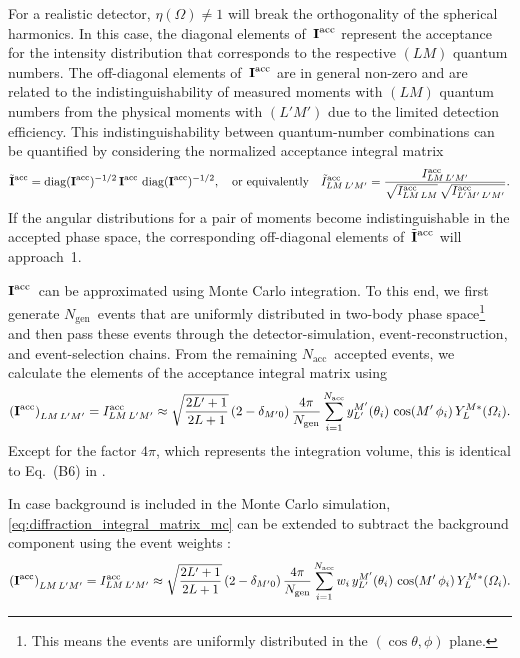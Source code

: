 For a realistic detector, $\eta(\Omega) \neq 1$ will break the
orthogonality of the spherical harmonics.  In this case, the diagonal
elements of~$\bm{\mathrm{I}}^\text{acc}$ represent the acceptance for the
intensity distribution that corresponds to the respective $(L M)$
quantum numbers.  The off-diagonal elements of~$\bm{\mathrm{I}}^\text{acc}$
are in general non-zero and are related to the indistinguishability of
measured moments with $(L M)$ quantum numbers from the physical
moments with $(L' M')$ due to the limited detection efficiency.  This
indistinguishability between quantum-number combinations can be
quantified by considering the normalized acceptance integral matrix
\begin{equation}
  \tilde{\bm{\mathrm{I}}}^\text{acc}
  = \operatorname{diag}(\bm{\mathrm{I}}^\text{acc})^{-1/2}\, \bm{\mathrm{I}}^\text{acc}\, \operatorname{diag}(\bm{\mathrm{I}}^\text{acc})^{-1/2},
  \quad\text{or equivalently}\quad
  \tilde{I}^\text{acc}_{L M\, L' M'}
  = \frac{I^\text{acc}_{L M\, L' M'}}{\sqrt{I^\text{acc}_{L M\, L M}}\, \sqrt{I^\text{acc}_{L' M'\, L' M'}}}.
\end{equation}
If the angular distributions for a pair of moments become
indistinguishable in the accepted phase space, the corresponding
off-diagonal elements of~$\tilde{\bm{\mathrm{I}}}^\text{acc}$ will approach~1.

$\bm{\mathrm{I}}^\text{acc}$~can be approximated using Monte Carlo
integration.  To this end, we first generate $N_\text{gen}$~events
that are uniformly distributed in two-body phase space\footnote{This
means the events are uniformly distributed in the $(\cos\theta, \phi)$
plane.} and then pass these events through the detector-simulation,
event-reconstruction, and event-selection chains.  From the remaining
$N_\text{acc}$~accepted events, we calculate the elements of the
acceptance integral matrix using
\begin{equation}
  \label{eq:diffraction_integral_matrix_mc}
  \rBrk{\mat{I}^\text{acc}}_{L M\, L' M'}
  = I^\text{acc}_{L M\, L' M'}
  \approx \sqrt{\frac{2 L' + 1}{2 L + 1}}\, (2 - \delta_{M' 0})\,
  \frac{4 \pi}{N_\text{gen}} \sum_{i = 1}^{N_\text{acc}} y_{L'}^{M'}(\theta_i)\, \cos(M'\, \phi_i)\, Y_L^{M *}(\Omega_i).
\end{equation}
Except for the factor $4 \pi$, which represents the integration
volume, this is identical to Eq.~(B6) in .

In case background is included in the Monte Carlo simulation,
\cref{eq:diffraction_integral_matrix_mc} can be extended to subtract the
background component using the event weights :
\begin{equation}
  \label{eq:diffraction_integral_matrix_mc_weighted}
  \rBrk{\mat{I}^\text{acc}}_{L M\, L' M'}
  = I^\text{acc}_{L M\, L' M'}
  \approx \sqrt{\frac{2 L' + 1}{2 L + 1}}\, (2 - \delta_{M' 0})\,
  \frac{4 \pi}{N_\text{gen}} \sum_{i = 1}^{N_\text{acc}} w_i\, y_{L'}^{M'}(\theta_i)\, \cos(M'\, \phi_i)\, Y_L^{M *}(\Omega_i).
\end{equation}

